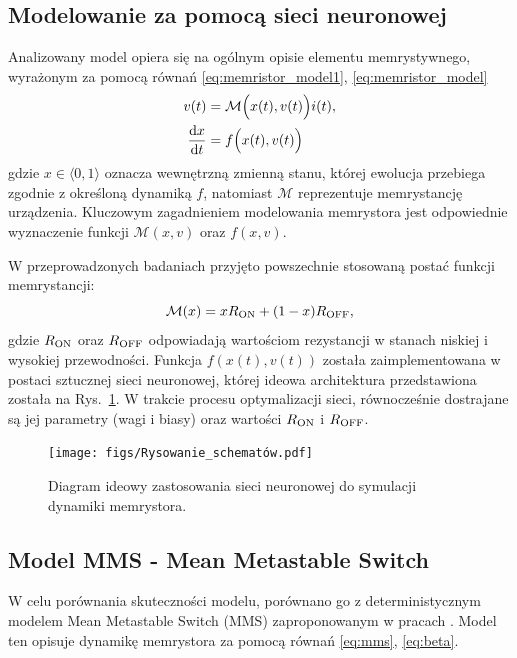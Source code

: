 \documentclass[11pt, oneside]{article}
\newcommand{\der}{{\rm d}}
\newcommand{\M}{\mathcal{M}}
\newcommand{\Ron}{R_{\rm ON}}
\newcommand{\Roff}{R_{\rm OFF}}
\newcommand{\ua}{v}
\newcommand{\ia}{i}
\newcommand{\xw}{x}
\begin{document}
\subsection{Modelowanie za pomocą sieci neuronowej}

Analizowany model opiera się na ogólnym opisie elementu memrystywnego, wyrażonym za pomocą równań \eqref{eq:memristor_model1}, \eqref{eq:memristor_model}
\begin{align}
    \label{eq:memristor_model1}
    \ua(t)                  & = \M \Big(\xw(t),\ua(t)\Big) \ia(t), \\
    \label{eq:memristor_model}
    \frac{\der \xw}{\der t} & = f\Big(\xw(t),\ua(t)\Big)
\end{align}
gdzie $\xw \in \langle 0, 1 \rangle$ oznacza wewnętrzną zmienną stanu, której ewolucja przebiega zgodnie z określoną dynamiką $f$, natomiast $\M$ reprezentuje memrystancję urządzenia. Kluczowym zagadnieniem modelowania memrystora jest odpowiednie wyznaczenie funkcji $\M(\xw, \ua)$ oraz $f(\xw, \ua)$.

W przeprowadzonych badaniach przyjęto powszechnie stosowaną postać funkcji memrystancji:
\begin{equation}
    \M(x) = x \Ron + (1-x) \Roff,
\end{equation}
gdzie $\Ron$ oraz $\Roff$ odpowiadają wartościom rezystancji w stanach niskiej i wysokiej przewodności. Funkcja $f(\xw(t), \ua(t))$ została zaimplementowana w postaci sztucznej sieci neuronowej, której ideowa architektura przedstawiona została na Rys.~\ref{fig:nn_structure}. W trakcie procesu optymalizacji sieci, równocześnie dostrajane są jej parametry (wagi i biasy) oraz wartości $\Ron$ i $\Roff$.

\begin{figure}[H]
    \centering
    \texttt{[image: figs/Rysowanie\_schematów.pdf]}
    \caption{Diagram ideowy zastosowania sieci neuronowej do symulacji dynamiki memrystora.}
    \label{fig:nn_structure}
\end{figure}

\subsection{Model MMS - Mean Metastable Switch}
W celu porównania skuteczności modelu, porównano go z deterministycznym modelem Mean Metastable Switch (MMS) zaproponowanym w pracach \cite{Molter2016, Ostrovskii2021}. Model ten opisuje dynamikę memrystora za pomocą równań \eqref{eq:mms}, \eqref{eq:beta}.
\end{document}
